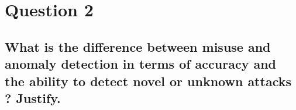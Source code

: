 \documentclass{report}
\begin{document}
	\section{Question 2}
	\startsection
		\renewcommand{\thesubsection}{\thesection.\Alph{subsection}}
		\subsection{What is the difference between misuse and anomaly detection in terms of accuracy and the ability to detect novel or unknown attacks ? Justify.}
		\startsubsection
		\closesection
	\closesection
\end{document}
